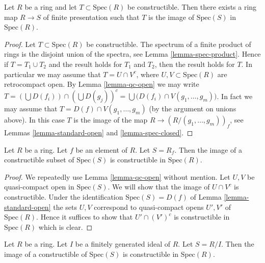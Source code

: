 \begin{lemma}
\label{lemma-constructible-is-image}
Let $R$ be a ring and let $T \subset \text{Spec}(R)$
be constructible. Then there exists a ring map $R \to S$ of
finite presentation such that $T$ is the image of
$\text{Spec}(S)$ in $\text{Spec}(R)$.
\end{lemma}

\begin{proof}
Let $T \subset \text{Spec}(R)$ be constructible.
The spectrum of a finite product of rings
is the disjoint union of the spectra, see
Lemma \ref{lemma-spec-product}. Hence if $T = T_1 \cup T_2$
and the result holds for $T_1$ and $T_2$, then the
result holds for $T$. In particular we may assume
that $T = U \cap V^c$, where $U, V \subset \text{Spec}(R)$
are retrocompact open. By Lemma \ref{lemma-qc-open} we may write
$T = (\bigcup D(f_i)) \cap (\bigcup D(g_j))^c =
\bigcup \big(D(f_i) \cap V(g_1, \ldots, g_m)\big)$.
In fact we may assume that $T = D(f) \cap V(g_1, \ldots, g_m)$
(by the argument on unions above).
In this case $T$ is the image of the map
$R \to (R/(g_1, \ldots, g_m))_f$, see Lemmas
\ref{lemma-standard-open} and \ref{lemma-spec-closed}.
\end{proof}

\begin{lemma}
\label{lemma-open-fp}
Let $R$ be a ring.
Let $f$ be an element of $R$.
Let $S = R_f$.
Then the image of a constructible subset of $\text{Spec}(S)$
is constructible in $\text{Spec}(R)$.
\end{lemma}

\begin{proof}
We repeatedly use Lemma \ref{lemma-qc-open} without mention.
Let $U, V$ be quasi-compact open in $\text{Spec}(S)$.
We will show that the image of $U \cap V^c$ is constructible.
Under the identification
$\text{Spec}(S) = D(f)$ of Lemma \ref{lemma-standard-open}
the sets $U, V$ correspond to quasi-compact opens
$U', V'$ of $\text{Spec}(R)$.
Hence it suffices to show that $U' \cap (V')^c$
is constructible in $\text{Spec}(R)$ which is clear.
\end{proof}

\begin{lemma}
\label{lemma-closed-fp}
Let $R$ be a ring.
Let $I$ be a finitely generated ideal of $R$.
Let $S = R/I$.
Then the image of a constructible of $\text{Spec}(S)$
is constructible in $\text{Spec}(R)$.
\end{lemma}


